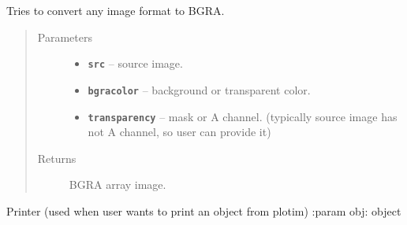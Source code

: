 \documentclass[letterpaper,10pt,english]{sphinxmanual}
\begin{document}

\begin{fulllineitems}
\label{RRtoolbox.lib:RRtoolbox.lib.plotter.convert2bgra}
Tries to convert any image format to BGRA.
\begin{quote}\begin{description}
\item[{Parameters}] \leavevmode\begin{itemize}
\item {} 
\textbf{\texttt{src}} -- source image.

\item {} 
\textbf{\texttt{bgracolor}} -- background or transparent color.

\item {} 
\textbf{\texttt{transparency}} -- mask or A channel.
(typically source image has not A channel, so user can provide it)

\end{itemize}

\item[{Returns}] \leavevmode
BGRA array image.

\end{description}\end{quote}

\end{fulllineitems}


\begin{fulllineitems}
\label{RRtoolbox.lib:RRtoolbox.lib.plotter.echo}
Printer (used when user wants to print an object from plotim)
:param obj: object

\end{fulllineitems}

\end{document}

